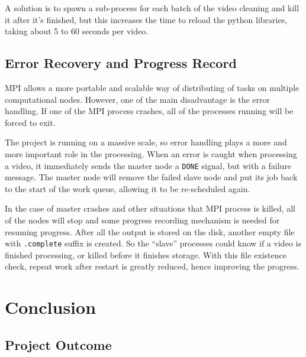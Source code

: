 \documentclass[bsc,logo,twoside,fullspacing,parskip]{infthesis}
\begin{document}
A solution is to spawn a sub-process for each batch of the video cleaning and kill it after it's finished, but this increases the time to reload the python libraries, taking about 5 to 60 seconds per video.


\section{Error Recovery and Progress Record}

MPI allows a more portable and scalable way of distributing of tasks on multiple computational nodes.
However, one of the main disadvantage is the error handling. 
If one of the MPI process crashes, all of the processes running will be forced to exit.

The project is running on a massive scale, so error handling plays a more and more important role in the processing. 
When an error is caught when processing a video, it immediately sends the master node a {\tt DONE} signal, but with a failure message. The master node will remove the failed slave node and put its job back to the start of the work queue, allowing it to be re-scheduled again.

In the case of master crashes and other situations that MPI process is killed, all of the nodes will stop and some progress recording mechanism is needed for resuming progress. After all the output is stored on the disk, another empty file with {\tt .complete} suffix is created. So the ``slave'' processes could know if a video is finished processing, or killed before it finishes storage. With this file existence check, repeat work after restart is greatly reduced, hence improving the progress.



\newpage

\chapter{Conclusion}
\label{chap:conclusion}

\section{Project Outcome}
\end{document}
